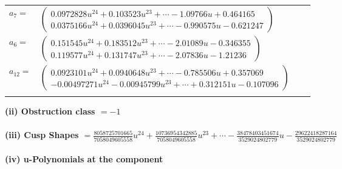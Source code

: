 \documentclass[1p]{elsarticle_modified}
\theoremstyle{definition}
\begin{document}
\begin{tabular}{m{7pt} m{180pt} m{7pt} m{180pt} }
\flushright $a_{7}=$&$\begin{pmatrix}0.0972828 u^{24}+0.103523 u^{23}+\cdots-1.09766 u+0.464165\\0.0375166 u^{24}+0.0396045 u^{23}+\cdots-0.990575 u-0.621247\end{pmatrix}$ \\
\flushright $a_{6}=$&$\begin{pmatrix}0.151545 u^{24}+0.183512 u^{23}+\cdots-2.01089 u-0.346355\\0.119577 u^{24}+0.131747 u^{23}+\cdots-2.07836 u-1.21236\end{pmatrix}$ \\
\flushright $a_{12}=$&$\begin{pmatrix}0.0923101 u^{24}+0.0940648 u^{23}+\cdots-0.785506 u+0.357069\\-0.00497271 u^{24}-0.00945799 u^{23}+\cdots+0.312151 u-0.107096\end{pmatrix}$\\&\end{tabular}
\flushleft \textbf{(ii) Obstruction class $= -1$}\\~\\
\flushleft \textbf{(iii) Cusp Shapes $= \frac{8058725701665}{7058049605558} u^{24}+\frac{10736954342885}{7058049605558} u^{23}+\cdots-\frac{38478403451674}{3529024802779} u-\frac{29622418287164}{3529024802779}$}\\~\\
\newpage\renewcommand{\arraystretch}{1}
\flushleft \textbf{(iv) u-Polynomials at the component}\newline \\
\end{document}
